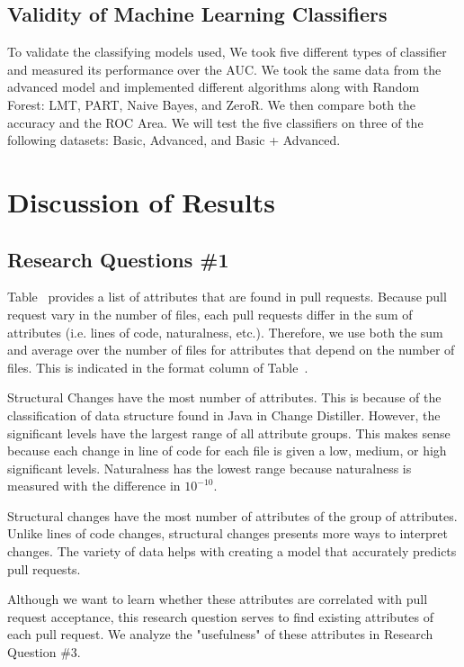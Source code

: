 \documentclass[10pt, conference]{IEEEtran}
\begin{document}
\subsection{Validity of Machine Learning Classifiers}
To validate the classifying models used, We took five different types of classifier and measured its performance over the AUC. We took the same data from the advanced model and implemented different algorithms along with Random Forest: LMT, PART, Naive Bayes, and ZeroR. We then compare both the accuracy and the ROC Area. We will test the five classifiers on three of the following datasets: Basic, Advanced, and Basic + Advanced.

\section{Discussion of Results}
\label{discussion}
\subsection{Research Questions \#1}
Table~\cite{figureListOfMetrics} provides a list of attributes that are found in pull requests. Because pull request vary in the number of files, each pull requests differ in the sum of attributes (i.e. lines of code, naturalness, etc.). Therefore, we use both the sum and average over the number of files for attributes that depend on the number of files. This is indicated in the format column of Table~\cite{figureListOfMetrics}.

Structural Changes have the most number of attributes. This is because of the classification of data structure found in Java in Change Distiller. However, the significant levels have the largest range of all attribute groups. This makes sense because each change in line of code for each file is given a low, medium, or high significant levels. Naturalness has the lowest range because naturalness is measured with the difference in $10^{-10}$.

Structural changes have the most number of attributes of the group of attributes. Unlike lines of code changes, structural changes presents more ways to interpret changes. The variety of data helps with creating a model that accurately predicts pull requests.

Although we want to learn whether these attributes are correlated with pull request acceptance, this research question serves to find existing attributes of each pull request. We analyze the "usefulness" of these attributes in Research Question \#3.
\end{document}
